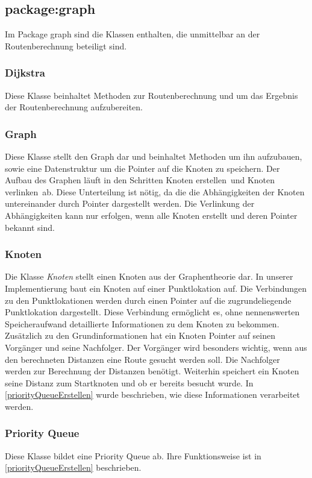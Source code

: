 \documentclass[12pt, a4paper, ngerman]{article}
\begin{document}
\subsection{package:graph}
Im Package graph sind die Klassen enthalten, die unmittelbar an der Routenberechnung beteiligt sind.

\subsubsection{Dijkstra}
Diese Klasse beinhaltet Methoden zur Routenberechnung und um das Ergebnis der Routenberechnung aufzubereiten. 

\subsubsection{Graph}
Diese Klasse stellt den Graph dar und beinhaltet Methoden um ihn aufzubauen, sowie eine Datenstruktur um die Pointer auf die Knoten zu speichern. Der Aufbau des Graphen läuft in den Schritten \glqq Knoten erstellen\grqq~und \glqq Knoten verlinken\grqq~ab. Diese Unterteilung ist nötig, da die die Abhängigkeiten der Knoten untereinander durch Pointer dargestellt werden. Die Verlinkung der Abhängigkeiten kann nur erfolgen, wenn alle Knoten erstellt und deren Pointer bekannt sind.



\subsubsection{Knoten \label{class:Knoten}}
Die Klasse \textit{Knoten} stellt einen Knoten aus der Graphentheorie dar. In unserer Implementierung baut ein Knoten auf einer Punktlokation auf. Die Verbindungen zu den Punktlokationen werden durch einen Pointer auf die zugrundeliegende Punktlokation dargestellt. Diese Verbindung ermöglicht es, ohne nennenswerten Speicheraufwand detaillierte Informationen zu dem Knoten zu bekommen. Zusätzlich zu den Grundinformationen hat ein Knoten Pointer auf seinen Vorgänger und seine Nachfolger. Der Vorgänger wird besonders wichtig, wenn aus den berechneten Distanzen eine Route gesucht werden soll. Die Nachfolger werden zur Berechnung der Distanzen benötigt. Weiterhin speichert ein Knoten seine Distanz zum Startknoten und ob er bereits besucht wurde. In \ref{priorityQueueErstellen} wurde beschrieben, wie diese Informationen verarbeitet werden.


\subsubsection{Priority Queue}
Diese Klasse bildet eine Priority Queue ab. Ihre Funktionsweise ist in \ref{priorityQueueErstellen} beschrieben. 
\end{document}

